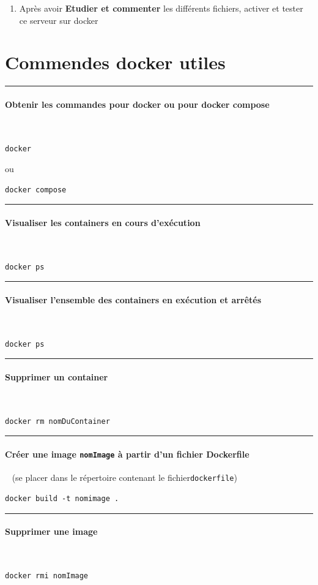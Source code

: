 \documentclass[french, 12pt]{article}%
\newcommand{\paraL}[1]{\tiny\noindent\rule{1.0\linewidth}{0.5pt}\paragraph*{#1}\  \normalsize}
\begin{document}
\begin{enumerate}
\item Après avoir \textbf{Etudier et commenter} les différents fichiers, activer et tester ce serveur sur docker 
\end{enumerate}





\appendix
\newpage
\section{Commendes docker utiles}
\label{lbl_CommandeUtiles}


\paraL{Obtenir les commandes pour docker ou pour docker compose}
\begin{lstlisting}[style=commande]
docker 
\end{lstlisting}

ou 

\begin{lstlisting}[style=commande]
docker compose 
\end{lstlisting}

\paraL{Visualiser les containers en cours d'exécution}

\begin{lstlisting}[style=commande]
docker ps
\end{lstlisting}


\paraL{Visualiser l'ensemble des containers en exécution et arrêtés}

\begin{lstlisting}[style=commande]
docker ps
\end{lstlisting}


\paraL{Supprimer un container}

\begin{lstlisting}[style=commande]
docker rm nomDuContainer
\end{lstlisting}

\paraL{Créer une image \verb?nomImage? à partir d'un fichier Dockerfile} (se placer dans le répertoire contenant le fichier\verb?dockerfile?)

\begin{lstlisting}[style=commande]
docker build -t nomimage .
\end{lstlisting}

\paraL{Supprimer une image}

\begin{lstlisting}[style=commande]
docker rmi nomImage
\end{lstlisting}
\end{document}
